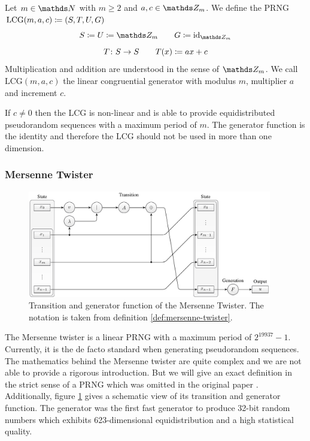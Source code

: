 \documentclass{stdlocal}
\begin{document}
    \begin{definition}
      Let $m\in\setNatural$ with $m\geq 2$ and $a,c\in\setInteger_m$.
      We define the PRNG $\mathrm{LCG}(m,a,c) \coloneqq (S,T,U,G)$
      \[
        S \define U \define \setInteger_m
        \separate
        G \define \identity_{\setInteger_m}
      \]
      \[
        T\colon S\to S
        \qquad
        T(x) \coloneqq a x + c
      \]
      Multiplication and addition are understood in the sense of $\setInteger_m$.
      We call $\mathrm{LCG}(m,a,c)$ the linear congruential generator with modulus $m$, multiplier $a$ and increment $c$.
    \end{definition}
    If $c\neq 0$ then the LCG is non-linear and is able to provide equidistributed pseudorandom sequences with a maximum period of $m$.
    The generator function is the identity and therefore the LCG should not be used in more than one dimension.
    \autocite{kneusel2018}

  \subsubsection*{Mersenne Twister} %
    \begin{figure}
      \center
      \includegraphics[width=0.95\textwidth]{figures/mt19937_scheme.pdf}
      \caption[Mersenne Twister Transition and Generation]{
        Transition and generator function of the Mersenne Twister.
        The notation is taken from definition \ref{def:mersenne-twister}.
      }
      \label{fig:mersenne-twister-transition-generation}
    \end{figure}

    The Mersenne twister is a linear PRNG with a maximum period of $2^{19937}-1$.
    Currently, it is the de facto standard when generating pseudorandom sequences.
    The mathematics behind the Mersenne twister are quite complex and we are not able to provide a rigorous introduction.
    But we will give an exact definition in the strict sense of a PRNG which was omitted in the original paper \autocite{matsumoto1998}.
    Additionally, figure \ref{fig:mersenne-twister-transition-generation} gives a schematic view of its transition and generator function.
    The generator was the first fast generator to produce 32-bit random numbers which exhibits 623-dimensional equidistribution and a high statistical quality.
    \autocite{kneusel2018}
\end{document}
